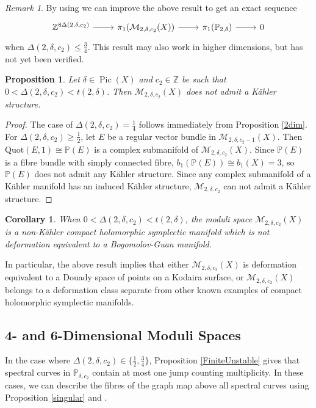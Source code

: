 \documentclass{article}[12pt]
\newtheorem{proposition}[theorem]{Proposition}
\newtheorem{corollary}{Corollary}[theorem]
\theoremstyle{definition}
\theoremstyle{remark}
\newtheorem{remark}[theorem]{Remark}
\newcommand \Z{\mathbb Z}
\numberwithin{equation}{section}
\newcommand \mc{\mathcal}
\newcommand \mb{\mathbb}
\DeclareMathOperator{\Pic}{Pic}
\begin{document}
\begin{remark}
    By using \cite[Lemma 3.5]{Arapura} we can improve the above result to get an exact sequence $$\begin{tikzcd}
    \Z^{8\Delta(2,\delta,c_2)} \arrow[r] & \pi_1(\mc{M}_{2,\delta,c_2}(X)) \arrow[r] & \pi_1(\mb{P}_{2,\delta}) \arrow[r] & 0
    \end{tikzcd}$$
    when $\Delta(2,\delta,c_2)\leq \frac{3}{4}$. This result may also work in higher dimensions, but has not yet been verified.
\end{remark}
\begin{proposition}
	Let $\delta\in \Pic(X)$ and $c_2\in \mathbb{Z}$ be such that $0<\Delta(2,\delta,c_2)<t(2,\delta)$. Then $\mc{M}_{2,\delta,c_2}(X)$ does not admit a K\"ahler structure.
\end{proposition}
\begin{proof}
	The case of $\Delta(2,\delta,c_2)=\frac{1}{4}$ follows immediately from Proposition \ref{2dim}. For $\Delta(2,\delta,c_2)\geq \frac{1}{2}$, let $E$ be a regular vector bundle in $\mc{M}_{2,\delta,c_2-1}(X).$ Then $\text{Quot}(E,1)\cong \mb{P}(E)$ is a complex submanifold of $\mc{M}_{2,\delta,c_2}(X)$. Since $\mb{P}(E)$ is a fibre bundle with simply connected fibre, $b_1(\mb{P}(E))\cong b_1(X)=3$, so $\mb{P}(E)$ does not admit any K\"ahler structure. Since any complex submanifold of a K\"ahler manifold has an induced K\"ahler structure, $\mc{M}_{2,\delta,c_2}$ can not admit a K\"ahler structure. 
\end{proof}
\begin{corollary}
	When $0<\Delta(2,\delta,c_2)<t(2,\delta)$, the moduli space $\mc{M}_{2,\delta,c_2}(X)$ is a non-K\"ahler compact holomorphic symplectic manifold which is not deformation equivalent to a Bogomolov-Guan manifold.
\end{corollary}
In particular, the above result implies that either $\mc{M}_{2,\delta,c_2}(X)$ is deformation equivalent to a Douady space of points on a Kodaira surface, or $\mc{M}_{2,\delta,c_2}(X)$ belongs to a deformation class separate from other known examples of compact holomorphic symplectic manifolds.

\subsection{4- and 6-Dimensional Moduli Spaces}
In the case where $\Delta(2,\delta,c_2)\in \{\frac{1}{2},\frac{3}{4}\}$, Proposition \ref{FiniteUnstable} gives that spectral curves in $\mb{P}_{\delta,c_2}$ contain at most one jump counting multiplicity. In these cases, we can describe the fibres of the graph map above all spectral curves using Proposition \ref{singular} and \cite[Theorem 4.5]{BrMoFM}.
\end{document}

